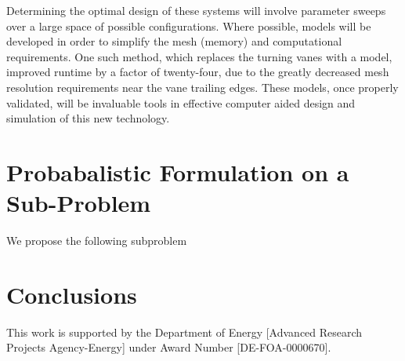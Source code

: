 \documentclass{article}
\begin{document}
Determining the optimal design of these systems will involve parameter
sweeps over a large space of possible configurations. Where possible,
models will be developed in order to simplify the mesh (memory) and
computational requirements. One such method, which replaces the turning
vanes with a model, improved runtime by a factor of twenty-four, due to
the greatly decreased mesh resolution requirements near the vane
trailing edges. These models, once properly validated, will be
invaluable tools in effective computer aided design and simulation of
this new technology.  







%
%
%
%
\section{Probabalistic Formulation on a Sub-Problem}


We propose the following subproblem

%
%
%
\section{Conclusions}




%
%
\newpage
This work is supported by the Department of Energy [Advanced Research
Projects Agency-Energy] under Award Number [DE-FOA-0000670].   
\end{document}

